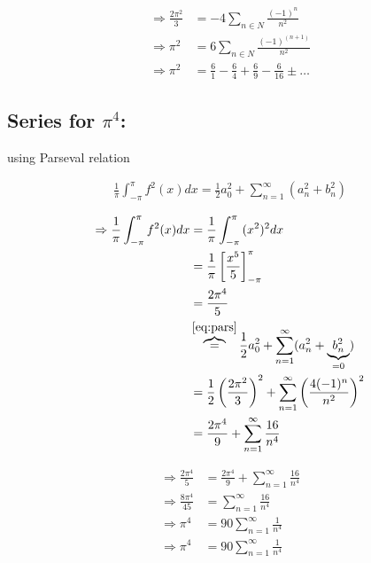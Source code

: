 \documentclass{article}
\begin{document}
\begin{align}
	\Rightarrow \frac{2\pi^2}{3} &=  - 4 \sum_{n\in N}{\frac{(-1)^n}{n^2}}\\
	\Rightarrow \pi^2 &=  6 \sum_{n\in N}{\frac{(-1)^{(n+1)}}{n^2}} \\
	\Rightarrow \pi^2 &=  \frac{6}{1} - \frac{6}{4} + \frac{6}{9} - \frac{6}{16} \pm \ldots
\end{align}

\subsection{Series for $\pi^4$:}
using Parseval relation

\begin{align}
	\frac{1}{\pi} \int_{-\pi}^\pi {f^2(x) dx} = \frac{1}{2} a_0^2 + \sum_{n=1}^\infty (a_n^2 + b_n^2)
	\label{eq:pars}
\end{align}

\begin{align}
	\Rightarrow \frac{1}{\pi} \int_{-\pi}^\pi {f^2(x) dx} &=  \frac{1}{\pi} \int_{-\pi}^\pi {(x^2)^2 dx}\\
		&= \frac{1}{\pi} \left[ \frac{x^5}{5} \right]_{-\pi}^\pi\\
		&= \frac{2\pi^4}{5}\\
		&\overbrace{=}^{\eqref{eq:pars}} \frac{1}{2} a_0^2 + \sum_{n=1}^\infty (a_n^2 + \underbrace{b_n^2}_{=0})\\
		&= \frac{1}{2} \left(\frac{2\pi^2}{3}\right)^2 + \sum_{n=1}^\infty \left( \frac{4(-1)^n}{n^2} \right)^2\\
		&= \frac{2\pi^4}{9} + \sum_{n=1}^\infty \frac{16}{n^4}
\end{align}

\begin{align}
	\Rightarrow \frac{2\pi^4}{5} &= \frac{2\pi^4}{9} + \sum_{n=1}^\infty \frac{16}{n^4} \\
	\Rightarrow \frac{8\pi^4}{45} &= \sum_{n=1}^\infty \frac{16}{n^4} \\
	\Rightarrow \pi^4 &= 90 \sum_{n=1}^\infty \frac{1}{n^4} \\
	\Rightarrow \pi^4 &= 90 \sum_{n=1}^\infty \frac{1}{n^4}
\end{align}
\end{document}
